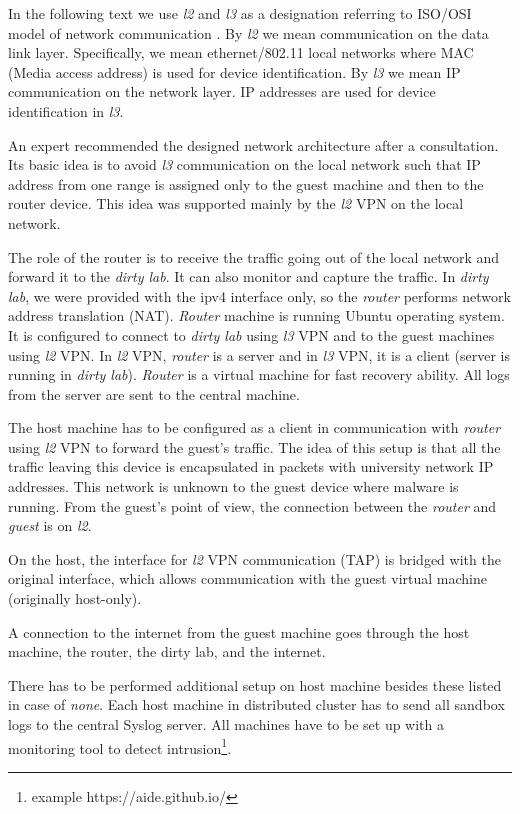 In the following text we use \emph{l2} and \emph{l3} as a designation referring to ISO/OSI model of network communication \cite{Zimmermann1980}. By \emph{l2} we mean communication on the data link layer. Specifically, we mean ethernet/802.11 local networks where MAC (Media access address) is used for device identification. By \emph{l3} we mean IP communication on the network layer. IP addresses are used for device identification in \emph{l3}.

An expert recommended the designed network architecture after a consultation. Its basic idea is to avoid \emph{l3} communication on the local network such that IP address from one range is assigned only to the guest machine and then to the router device. This idea was supported mainly by the \emph{l2} VPN on the local network.

The role of the router is to receive the traffic going out of the local network and forward it to the \emph{dirty lab}. It can also monitor and capture the traffic. In \emph{dirty lab}, we were provided with the ipv4 interface only, so the \emph{router} performs network address translation (NAT). \emph{Router} machine is running Ubuntu operating system. It is configured to connect to \emph{dirty lab} using \emph{l3} VPN and to the guest machines using \emph{l2} VPN. In \emph{l2} VPN, \emph{router} is a server and in \emph{l3} VPN, it is a client (server is running in \emph{dirty lab}). \emph{Router} is a virtual machine for fast recovery ability. All logs from the server are sent to the central machine.

The host machine has to be configured as a client in communication with \emph{router} using \emph{l2} VPN to forward the guest's traffic. The idea of this setup is that all the traffic leaving this device is encapsulated in packets with university network IP addresses. This network is unknown to the guest device where malware is running. From the guest's point of view, the connection between the \emph{router} and \emph{guest} is on \emph{l2}. 

On the host, the interface for \emph{l2} VPN communication (TAP) is bridged with the original interface, which allows communication with the guest virtual machine (originally host-only). 

A connection to the internet from the guest machine goes through the host machine, the router, the dirty lab, and the internet. 

There has to be performed additional setup on host machine besides these listed in case of \emph{none}. Each host machine in distributed cluster has to send all sandbox logs to the central Syslog server. All machines have to be set up with a monitoring tool to detect intrusion\footnote{example https://aide.github.io/}.

